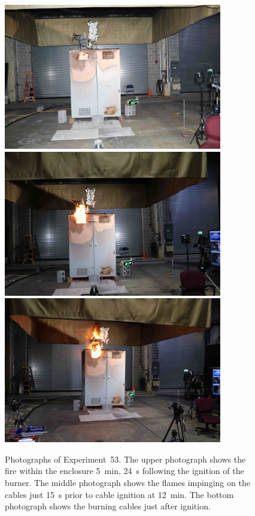 \begin{figure}[p]
\centering
\includegraphics[height=2.50in]{../FIGURES/Test_53_5_min_24_s} \\ \vspace{0.1in}
\includegraphics[height=2.50in]{../FIGURES/Test_53_11_min_45_s} \\ \vspace{0.1in}
\includegraphics[height=2.50in]{../FIGURES/Test_53_ignition}
\caption[Photographs of Experiment~53]{Photographs of Experiment~53. The upper photograph shows the fire within the enclosure 5~min, 24~s following the ignition of the burner. The middle photograph shows the flames impinging on the cables just 15~s prior to cable ignition at 12~min. The bottom photograph shows the burning cables just after ignition.}
\label{fig:Test_53_photos}
\end{figure}


